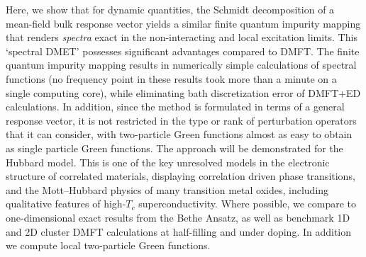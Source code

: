 \documentclass[aps,twocolumn,nobibnotes]{revtex4}
\begin{document}
Here, we show that for dynamic quantities, the Schmidt decomposition of a mean-field bulk response vector yields a similar finite quantum impurity mapping
that renders {\em spectra} exact in the non-interacting and local excitation limits. This `spectral DMET' possesses significant advantages compared to
DMFT. The finite quantum impurity mapping results in numerically simple calculations of spectral functions (no frequency point in these results
took more than a minute on a single computing core), while eliminating bath discretization error of DMFT+ED calculations.
In addition, since the method is formulated in terms of a general response vector, it is not restricted in the type or rank of perturbation 
operators that it can consider, with two-particle Green functions almost as easy to obtain as single particle Green functions. 
The approach will be demonstrated for the Hubbard model. 
This is one of the key unresolved models in 
the electronic structure of correlated materials, displaying correlation driven 
phase transitions, and the Mott--Hubbard physics of many transition metal oxides\cite{Limelette2003}, including qualitative features 
of high-$T_c$ superconductivity\cite{Anderson87,Sordi2012,Millis2013}. Where possible, we compare to one-dimensional exact results from the Bethe 
Ansatz\cite{Lieb68,Ovchinni1970}, as well as benchmark 1D and 2D cluster DMFT calculations at half-filling 
and under doping\cite{Go2009,Kotliar2008,Masatoshi2009}. In addition we compute local two-particle Green functions.
\end{document}
